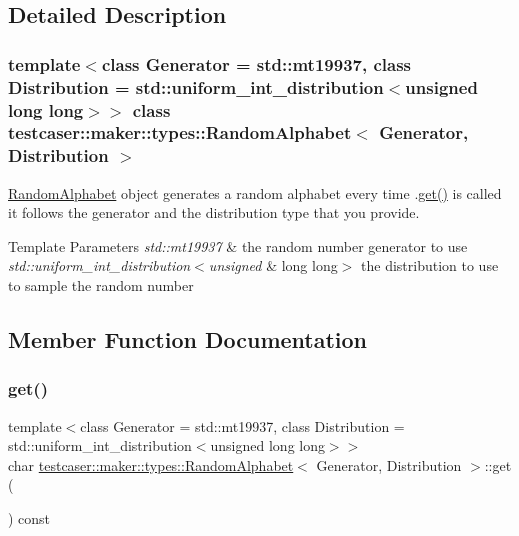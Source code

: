 \subsection{Detailed Description}
\subsubsection*{template$<$class Generator = std\+::mt19937, class Distribution = std\+::uniform\+\_\+int\+\_\+distribution$<$unsigned long long$>$$>$\newline
class testcaser\+::maker\+::types\+::\+Random\+Alphabet$<$ Generator, Distribution $>$}

\hyperlink{classtestcaser_1_1maker_1_1types_1_1RandomAlphabet}{Random\+Alphabet} object generates a random alphabet every time .\hyperlink{classtestcaser_1_1maker_1_1types_1_1RandomAlphabet_a6498f1e44b84cb66c1c1dc6de642b218}{get()} is called it follows the generator and the distribution type that you provide. 


\begin{DoxyTemplParams}{Template Parameters}
{\em std\+::mt19937} & the random number generator to use \\
\hline
{\em std\+::uniform\+\_\+int\+\_\+distribution$<$unsigned} & long long$>$ the distribution to use to sample the random number \\
\hline
\end{DoxyTemplParams}


\subsection{Member Function Documentation}
\mbox{\label{classtestcaser_1_1maker_1_1types_1_1RandomAlphabet_a6498f1e44b84cb66c1c1dc6de642b218}} 
\subsubsection{\texorpdfstring{get()}{get()}}
{\footnotesize\ttfamily template$<$class Generator = std\+::mt19937, class Distribution = std\+::uniform\+\_\+int\+\_\+distribution$<$unsigned long long$>$$>$ \\
char \hyperlink{classtestcaser_1_1maker_1_1types_1_1RandomAlphabet}{testcaser\+::maker\+::types\+::\+Random\+Alphabet}$<$ Generator, Distribution $>$\+::get (\begin{DoxyParamCaption}{ }\end{DoxyParamCaption}) const\hspace{0.3cm}{\ttfamily [inline]}}



